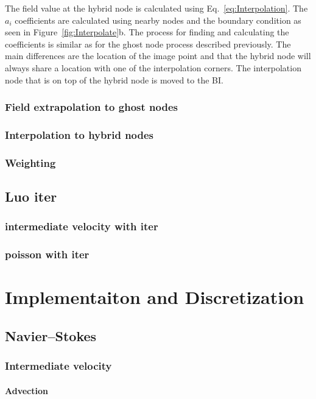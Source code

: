 \documentclass[onehalf,11pt]{beavtex}
\begin{document}
The field value at the hybrid node is calculated using Eq.~\eqref{eq:Interpolation}.
The $a_i$ coefficients are calculated using nearby nodes and the boundary condition as seen in Figure~\ref{fig:Interpolate}b.
The process for finding and calculating the coefficients is similar as for the ghost node process described previously.
The main differences are the location of the image point and that the hybrid node will always share a location with one of the interpolation corners.
The interpolation node that is on top of the hybrid node is moved to the BI.


\subsection{Field extrapolation to ghost nodes}
\subsection{Interpolation to hybrid nodes}
\subsection{Weighting}\label{Sec:Weighting}
\section{Luo iter}
\subsection{intermediate velocity with iter}
\subsection{poisson with iter}


\chapter{Implementaiton and Discretization}\label{Implementation}
\section{Navier--Stokes}
\subsection{Intermediate velocity}
\subsubsection{Advection}
\end{document}
